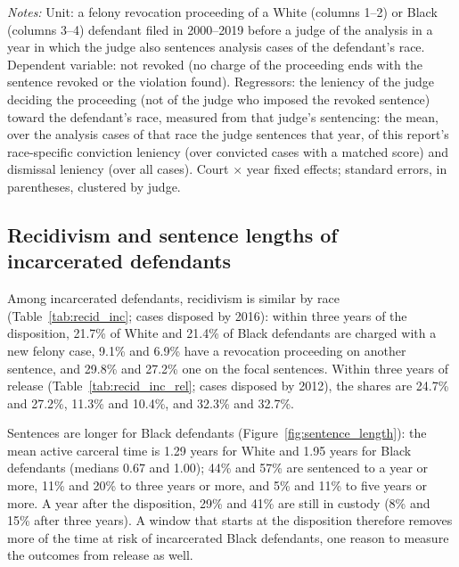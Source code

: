 \documentclass[11pt]{article}
\newcommand{\tabnote}[1]{\par\vspace{0.6ex}\begin{minipage}{\linewidth}\linespread{1}\footnotesize\textit{Notes:} #1\end{minipage}}
\begin{document}
\begin{table}[H]
\centering
\caption{Revocation decisions and the deciding judge's sentencing leniency}\label{tab:rev_decisions}
{\small\renewcommand{\arraystretch}{0.9}\resizebox{\textwidth}{!}{}}
\tabnote{Unit: a felony revocation proceeding of a White (columns 1--2) or Black (columns 3--4) defendant filed in 2000--2019 before a judge of the analysis in a year in which the judge also sentences analysis cases of the defendant's race. Dependent variable: not revoked (no charge of the proceeding ends with the sentence revoked or the violation found). Regressors: the leniency of the judge deciding the proceeding (not of the judge who imposed the revoked sentence) toward the defendant's race, measured from that judge's sentencing: the mean, over the analysis cases of that race the judge sentences that year, of this report's race-specific conviction leniency (over convicted cases with a matched score) and dismissal leniency (over all cases). Court $\times$ year fixed effects; standard errors, in parentheses, clustered by judge.}
\end{table}

\subsection{Recidivism and sentence lengths of incarcerated defendants}\label{sec:base_recid}

Among incarcerated defendants, recidivism is similar by race (Table~\ref{tab:recid_inc}; cases disposed by 2016): within three years of the disposition, 21.7\% of White and 21.4\% of Black defendants are charged with a new felony case, 9.1\% and 6.9\% have a revocation proceeding on another sentence, and 29.8\% and 27.2\% one on the focal sentences. Within three years of release (Table~\ref{tab:recid_inc_rel}; cases disposed by 2012), the shares are 24.7\% and 27.2\%, 11.3\% and 10.4\%, and 32.3\% and 32.7\%.

Sentences are longer for Black defendants (Figure~\ref{fig:sentence_length}): the mean active carceral time is 1.29 years for White and 1.95 years for Black defendants (medians 0.67 and 1.00); 44\% and 57\% are sentenced to a year or more, 11\% and 20\% to three years or more, and 5\% and 11\% to five years or more. A year after the disposition, 29\% and 41\% are still in custody (8\% and 15\% after three years). A window that starts at the disposition therefore removes more of the time at risk of incarcerated Black defendants, one reason to measure the outcomes from release as well.
\end{document}
